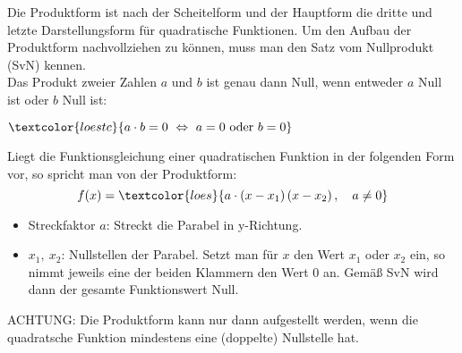 Die Produktform ist nach der Scheitelform und der Hauptform die dritte und letzte Darstellungsform für quadratische Funktionen. Um den Aufbau der Produktform nachvollziehen zu können, muss man den Satz vom Nullprodukt (SvN) kennen.\\
Das Produkt zweier Zahlen \(a\) und \(b\) ist genau dann Null, wenn entweder \(a\) Null ist oder \(b\) Null ist:
\begin{tcolorbox}\centering
	\(\textcolor{loestc}{a\cdot b=0\ \Leftrightarrow\ a=0\text{ oder }b=0}\)
\end{tcolorbox}
Liegt die Funktionsgleichung einer quadratischen Funktion in der folgenden Form vor, so spricht man von der Produktform:
\[f(x)=\textcolor{loes}{a\cdot \left(x-x_1\right)\left(x-x_2\right), \quad a\neq 0}\]
\begin{itemize}
	\item Streckfaktor \(a\): \textcolor{loes}{Streckt die Parabel in y-Richtung.}\vspace{0.8cm}
	\item \(x_1,\ x_2\): \textcolor{loes}{Nullstellen der Parabel. Setzt man für \(x\) den Wert \(x_1\) oder \(x_2\) ein, so nimmt jeweils eine der beiden Klammern den Wert 0 an. Gemäß SvN wird dann der gesamte Funktionswert Null.}\vspace{0.8cm}
\end{itemize}
\begin{tcolorbox}\centering
	\textcolor{loestc}{ACHTUNG: Die Produktform kann nur dann aufgestellt werden, wenn die quadratsche Funktion mindestens eine (doppelte) Nullstelle hat.}
\end{tcolorbox}

